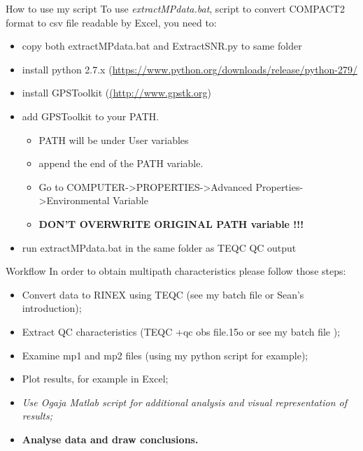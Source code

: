 \documentclass[9pt]{beamer}
\begin{document}
	\begin{frame}{How to use my script}
		To use \textit{extractMPdata.bat}, script to convert COMPACT2 format to csv file readable by Excel, you need to:
		\begin{itemize}
			\item copy both extractMPdata.bat and ExtractSNR.py to same folder
			\item install python 2.7.x (\url{https://www.python.org/downloads/release/python-279/}
			\item install GPSToolkit (\url{(http://www.gpstk.org})
			\item add GPSToolkit to your PATH. 
				\begin{itemize}
					\item PATH will be under User variables
					\item append  the end of the PATH variable.
					\item Go to COMPUTER->PROPERTIES->Advanced Properties->Environmental Variable
					\item \textbf{DON'T OVERWRITE ORIGINAL PATH variable !!!}
				\end{itemize}
			\item run extractMPdata.bat in the same folder as TEQC QC output
		\end{itemize}
		
	\end{frame}	
	
	\begin{frame}{Workflow}
		In order to obtain multipath characteristics please follow those steps:
		
		\begin{itemize}
			\item Convert data to RINEX using TEQC (see my batch file or Sean's introduction);
			\item {Extract QC characteristics  (TEQC +qc obs file.15o or see my batch file )};
			\item Examine mp1 and mp2 files (using my python script for example);
			\item Plot results, for example in Excel;
			\item \textit{Use Ogaja Matlab script for additional analysis and visual representation of results;}
			\item \textbf{Analyse data and draw conclusions.}
		\end{itemize}

	\end{frame}
\end{document}
